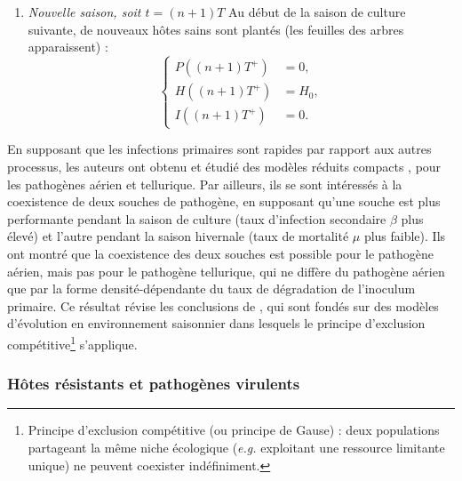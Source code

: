 \begin{enumerate}
\begin{equation}
\begin{aligned}
	        I~ &= 0. \\
	        \end{aligned}
	    \right.
	    \label{eq:mailleret-intersaison}
	\end{equation} 
	\item  \emph{Nouvelle saison, soit $t=(n+1)T$}\quad
	  Au début de la saison de culture suivante, de nouveaux hôtes sains sont plantés (les feuilles des arbres apparaissent) :
	  \begin{equation}
	   \left\{
	      \begin{aligned}
	        P((n+1)T^{+}) &= 0,\\
	        H((n+1)T^{+}) &= H_0, \\
	        I((n+1)T^{+}) &= 0.
	      \end{aligned}
	    \right.
	    \label{eq:mailleret-plant}
	  \end{equation}
	\end{enumerate}
		
	En supposant que les infections primaires sont rapides par rapport aux autres processus, les auteurs ont obtenu et étudié des modèles réduits \og compacts \fg{}, pour les pathogènes aérien et tellurique. Par ailleurs, ils se sont intéressés à la coexistence de deux souches de pathogène, en supposant qu'une souche est plus performante pendant la saison de culture (taux d'infection secondaire $\beta$ plus élevé) et l'autre pendant la saison hivernale (taux de mortalité $\mu$ plus faible). Ils ont montré que la coexistence des deux souches est possible pour le pathogène aérien, mais pas pour le pathogène tellurique, qui ne diffère du pathogène aérien que par la forme densité-dépendante du taux de dégradation de l'inoculum primaire. Ce résultat révise les conclusions de \citet{Vandenberg2010,Vandenberg2011}, qui sont fondés sur des modèles d'évolution en environnement saisonnier dans lesquels le principe d'exclusion compétitive\footnote{Principe d'exclusion compétitive (ou principe de Gause) : deux populations partageant la même niche écologique (\textit{e.g.} exploitant une ressource limitante unique) ne peuvent coexister indéfiniment.} s'applique.
	
	
\subsubsection{Hôtes résistants et  pathogènes virulents}
\label{sec:resist-virul}
	
	
	
